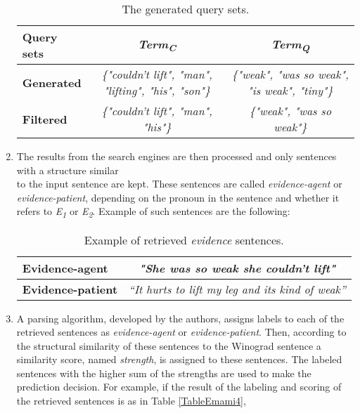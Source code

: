 \begin{enumerate}
	\begin{table}[h!]
		\begin{center}
	
		\small
		\begin{tabular}{l|c |c}
			\textbf{Query sets} & \textit{Term\textsubscript{C}} & \textit{Term\textsubscript{Q}}\\\hline
			\textbf{Generated}  & \textit{\{"couldn't lift", "man",  "lifting", "his", "son"\}} &  \textit{\{"weak", "was so weak", "is weak", "tiny"\}}\\\hline
		
		 	\textbf{Filtered}& \textit{\{"couldn't lift", "man", "his"\}} & \textit{\{"weak", "was so weak"\}}
			
		\end{tabular}
		\caption{{\label{TableEmami2}}The generated query sets.}
			
	\end{center}
	\end{table}
	
	\item The results from the search engines are then processed and only sentences with a structure similar \\to the input sentence are kept. 
	These sentences are called \textit{evidence-agent} or \textit{evidence-patient}, depending on the pronoun in the sentence and whether it refers to \textit{E\textsubscript{1}} or \textit{E\textsubscript{2}}. Example of such sentences are the following:
	\begin{table}[h!]
	\begin{center}
	
		\begin{tabular}{l|c }
			\textbf{Evidence-agent} & \textit{"She was so weak she couldn’t lift"}  \\\hline
			\textbf{Evidence-patient}  & \textit{“It hurts to lift my leg and its kind of weak”}
		\end{tabular}
		\caption{{\label{TableEmami3}}Example of retrieved \textit{evidence} sentences.}
		
	\end{center}
	\end{table}
		
	\item A parsing algorithm, developed by the authors, assigns labels to each of the retrieved sentences  as  \textit{evidence-agent} or \textit{evidence-patient}. Then, according to the structural similarity of these sentences to the Winograd sentence a similarity score, named \textit{strength}, is assigned to these sentences. The labeled sentences with the higher sum of the strengths are used to make the prediction decision. For example, if the result of the labeling and scoring of the retrieved sentences is 
	as in Table \ref{TableEmami4}, 
	\begin{table}[h!]
	\begin{center}
				

\end{center}
\end{table}
\end{enumerate}
